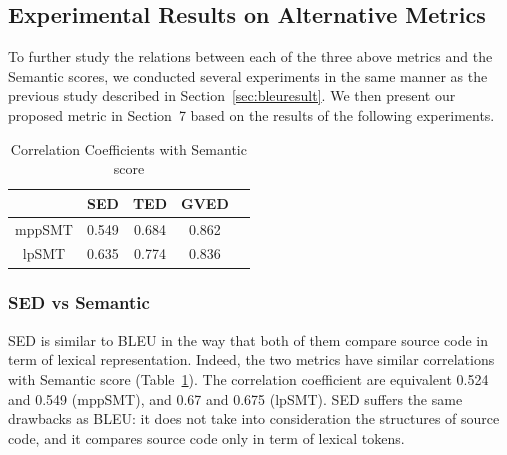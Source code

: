 \subsection{Experimental Results on Alternative Metrics}

To further study the relations between each of the three above metrics
and the Semantic scores, we conducted several experiments in the same
manner as the previous study described in
Section~\ref{sec:bleuresult}. We then present our proposed metric
in Section~7 based on the results of the following experiments.
 

\begin{table}
\caption{Correlation Coefficients with Semantic score}
\begin{tabular}{|c|c|c|c|c|}
\hline
 & SED & TED & GVED\\
\hline
mppSMT  & 0.549 & 0.684 & 0.862 \\
lpSMT  & 0.635 & 0.774 & 0.836 \\
\hline
\end{tabular}
\label{table:correlation}
\end{table}


\subsubsection{\textbf{SED vs Semantic}}

SED is similar to BLEU in the way that both of them compare source
code in term of lexical representation. Indeed, the two metrics have
similar correlations with Semantic score
(Table~\ref{table:correlation}). The correlation coefficient are
equivalent 0.524 and 0.549 (mppSMT), and 0.67 and 0.675 (lpSMT). SED
suffers the same drawbacks as BLEU: it does not take into
consideration the structures of source code, and it compares source
code only in term of lexical tokens. 

%

